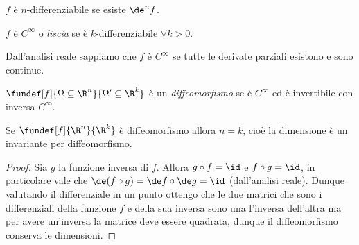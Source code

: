\begin{defn}
	$f$ è $n$-differenziabile se esiste $\de^n f$.
\end{defn}

\begin{defn}
	$f$ è $C^{\infty}$ o \emph{liscia} se è $k$-differenziabile $\forall k > 0$.
\end{defn}

\begin{fat}
	Dall'analisi reale sappiamo che $f$ è $C^{\infty}$
	se tutte le derivate parziali esistono e sono continue.
\end{fat}

\begin{defn}[Diffeomorfismo]
	$\fundef[f]{\Omega \subseteq \R^n}{\Omega' \subseteq \R^k}$ è un \emph{diffeomorfismo}
	se è $C^\infty$ ed è invertibile con inversa $C^{\infty}$.
\end{defn}

\begin{prop}
	Se $\fundef[f]{\R^n}{\R^k}$ è diffeomorfismo allora $n = k$,
	cioè la dimensione è un invariante per diffeomorfismo.
\end{prop}

\begin{proof}
	Sia $g$ la funzione inversa di $f$.
	Allora $g \circ f = \id$ e $f \circ g = \id$,
	in particolare vale che $\de(f \circ g) = \de f \circ \de g = \id$ (dall'analisi reale).
	Dunque valutando il differenziale in un punto ottengo che le due matrici
	che sono i differenziali della funzione $f$ e della sua inversa
	sono una l'inversa dell'altra ma per avere un'inversa la matrice deve essere quadrata,
	dunque il diffeomorfismo conserva le dimensioni.
\end{proof}

